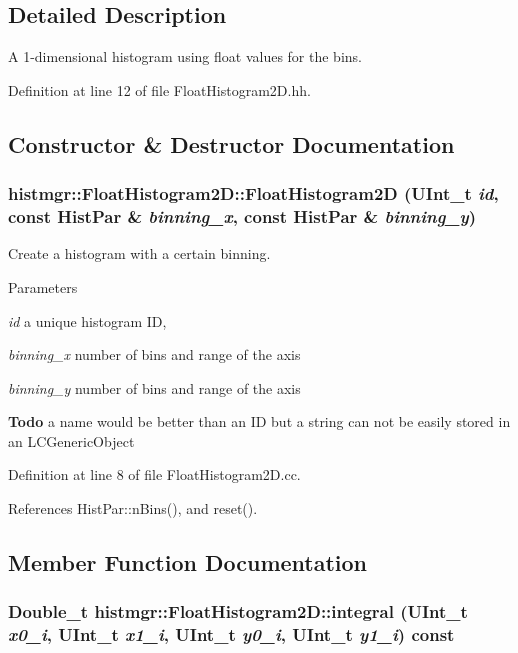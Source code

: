 \subsection{Detailed Description}
A 1-\/dimensional histogram using float values for the bins. 

Definition at line 12 of file FloatHistogram2D.hh.

\subsection{Constructor \& Destructor Documentation}
\subsubsection[{FloatHistogram2D}]{\setlength{\rightskip}{0pt plus 5cm}histmgr::FloatHistogram2D::FloatHistogram2D (UInt\_\-t {\em id}, \/  const {\bf HistPar} \& {\em binning\_\-x}, \/  const {\bf HistPar} \& {\em binning\_\-y})}\label{classhistmgr_1_1FloatHistogram2D_a2c53fd92a0a2ffa78589ff109acd1b4b}


Create a histogram with a certain binning. 
\begin{DoxyParams}{Parameters}
\item[{\em id}]a unique histogram ID, \item[{\em binning\_\-x}]number of bins and range of the axis \item[{\em binning\_\-y}]number of bins and range of the axis \end{DoxyParams}
\begin{Desc}
\item[{\bf Todo}]a name would be better than an ID but a string can not be easily stored in an LCGenericObject \end{Desc}


Definition at line 8 of file FloatHistogram2D.cc.

References HistPar::nBins(), and reset().

\subsection{Member Function Documentation}
\subsubsection[{integral}]{\setlength{\rightskip}{0pt plus 5cm}Double\_\-t histmgr::FloatHistogram2D::integral (UInt\_\-t {\em x0\_\-i}, \/  UInt\_\-t {\em x1\_\-i}, \/  UInt\_\-t {\em y0\_\-i}, \/  UInt\_\-t {\em y1\_\-i}) const}\label{classhistmgr_1_1FloatHistogram2D_a32dfa904050e2f247175eb6435147323}


